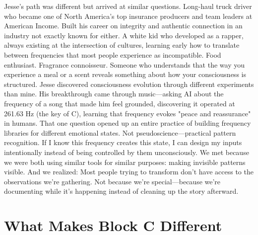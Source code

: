 \documentclass[12pt,openany]{book}
\begin{document}
Jesse's path was different but arrived at similar questions.
Long-haul truck driver who became one of North America's top insurance producers and team leaders at American Income. Built his career on integrity and authentic connection in an industry not exactly known for either.
A white kid who developed as a rapper, always existing at the intersection of cultures, learning early how to translate between frequencies that most people experience as incompatible.
Food enthusiast. Fragrance connoisseur. Someone who understands that the way you experience a meal or a scent reveals something about how your consciousness is structured.
Jesse discovered consciousness evolution through different experiments than mine.
His breakthrough came through music—asking AI about the frequency of a song that made him feel grounded, discovering it operated at 261.63 Hz (the key of C), learning that frequency evokes "peace and reassurance" in humans.
That one question opened up an entire practice of building frequency libraries for different emotional states. Not pseudoscience—practical pattern recognition. If I know this frequency creates this state, I can design my inputs intentionally instead of being controlled by them unconsciously.
We met because we were both using similar tools for similar purposes: making invisible patterns visible.
And we realized: Most people trying to transform don't have access to the observations we're gathering. Not because we're special—because we're documenting while it's happening instead of cleaning up the story afterward.

\section{What Makes Block C Different}
\end{document}
